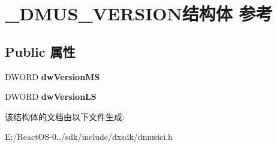 \hypertarget{struct___d_m_u_s___v_e_r_s_i_o_n}{}\section{\+\_\+\+D\+M\+U\+S\+\_\+\+V\+E\+R\+S\+I\+O\+N结构体 参考}
\label{struct___d_m_u_s___v_e_r_s_i_o_n}
\subsection*{Public 属性}
\begin{DoxyCompactItemize}
\item 
\mbox{\label{struct___d_m_u_s___v_e_r_s_i_o_n_a68323d6712706b079b122bf136c511e6}} 
D\+W\+O\+RD {\bfseries dw\+Version\+MS}
\item 
\mbox{\label{struct___d_m_u_s___v_e_r_s_i_o_n_ae6425421a8311043c8759f26259bf3b1}} 
D\+W\+O\+RD {\bfseries dw\+Version\+LS}
\end{DoxyCompactItemize}


该结构体的文档由以下文件生成\+:\begin{DoxyCompactItemize}
\item 
E\+:/\+React\+O\+S-\/0../sdk/include/dxsdk/dmusici.\+h\end{DoxyCompactItemize}

